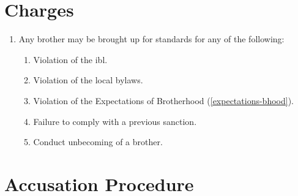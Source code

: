 \section{Charges}

	\begin{enumerate}
		\item Any brother may be brought up for standards for any of the following:
		
		\begin{enumerate}
			\item Violation of the \gls{ibl}.
			\item Violation of the local bylaws.
			\item Violation of the Expectations of Brotherhood (\autoref{expectations-bhood}).
			\item Failure to comply with a previous sanction.
			\item Conduct unbecoming of a brother.
		\end{enumerate}

	\end{enumerate}

\section{Accusation Procedure}

